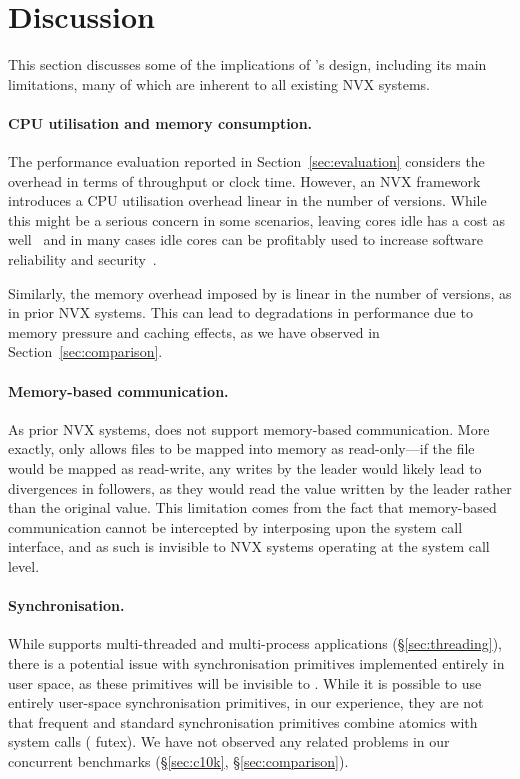 \section{Discussion}
\label{efficient-execution:discussion}

This section discusses some of the implications of \varan's design,
including its main limitations, many of which are inherent to all
existing NVX systems.

\paragraph{CPU utilisation and memory consumption.} The performance
evaluation reported in Section~\ref{sec:evaluation} considers the
overhead in terms of throughput or clock time.  However, an NVX
framework introduces a CPU utilisation overhead linear in the number
of versions.  While this might be a serious concern in some scenarios,
leaving cores idle has a cost as well~\cite{barroso2007} and in many
cases idle cores can be profitably used to increase software reliability
and security~\cite{cox2006,multiplicity,orchestra09,diehard06,mvupdates12}.

Similarly, the memory overhead imposed by \varan is linear in the
number of versions, as in prior NVX systems.  This can lead to
degradations in performance due to memory pressure and caching
effects, as we have observed in Section~\ref{sec:comparison}.


\paragraph{Memory-based communication.} As prior NVX systems, \varan
does not support memory-based communication.  More exactly, \varan
only allows files to be mapped into memory as read-only---if the file
would be mapped as read-write, any writes by the leader would likely
lead to divergences in followers, as they would read the value written
by the leader rather than the original value.  This limitation comes
from the fact that memory-based communication cannot be intercepted by
interposing upon the system call interface, and as such is invisible
to NVX systems operating at the system call level.


\paragraph{Synchronisation.} While \varan supports multi-threaded and
multi-process applications (\S\ref{sec:threading}), there is a
potential issue with synchronisation primitives implemented entirely
in user space, as these primitives will be invisible to \varan. While
it is possible to use entirely user-space synchronisation primitives,
in our experience, they are not that frequent and standard
synchronisation primitives combine atomics with system calls (\ie
futex). We have not observed any related problems in our concurrent
benchmarks (\S\ref{sec:c10k}, \S\ref{sec:comparison}).

